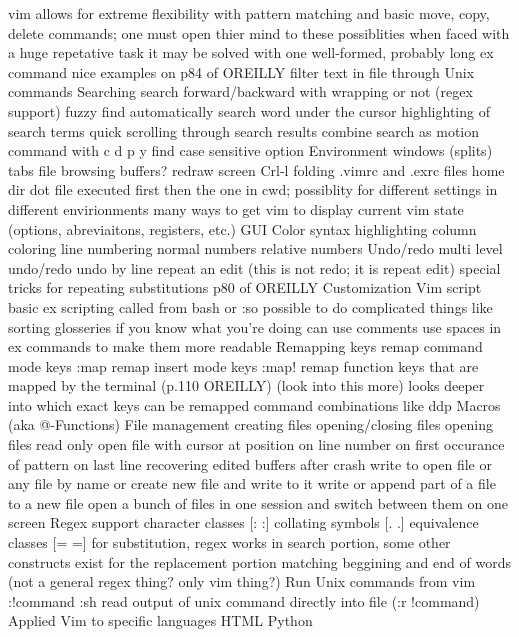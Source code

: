 \documentclass[12pt]{book}
\begin{document}
    vim allows for extreme flexibility with pattern matching and basic move, copy, delete commands; one must open thier mind to these possiblities when faced with a huge repetative task
    it may be solved with one well-formed, probably long ex command
    nice examples on p84 of OREILLY
  filter text in file through Unix commands
Searching
  search forward/backward with wrapping or not (regex support)
  fuzzy find
  automatically search word under the cursor
  highlighting of search terms
  quick scrolling through search results
  combine search as motion command with c d p y
  find
  case sensitive option
Environment
  windows (splits)
  tabs
  file browsing
  buffers?
  redraw screen Crl-l
  folding
  .vimrc and .exrc files
    home dir dot file executed first then the one in cwd; possiblity for different settings in different envirionments
  many ways to get vim to display current vim state (options, abreviaitons, registers, etc.)
GUI
  Color
    syntax highlighting
    column coloring
  line numbering
    normal numbers
    relative numbers
Undo/redo
  multi level undo/redo
  undo by line
  repeat an edit (this is not redo; it is repeat edit)
  special tricks for repeating substitutions p80 of OREILLY
Customization
  Vim script
    basic ex scripting called from bash or :so
      possible to do complicated things like sorting glosseries if you know what you're doing
      can use comments 
      use spaces in ex commands to make them more readable
  Remapping keys
    remap command mode keys :map
    remap insert mode keys :map!
    remap function keys that are mapped by the terminal (p.110 OREILLY) (look into this more)
    looks deeper into which exact keys can be remapped
  command combinations like ddp
  Macros (aka @-Functions)
File management
  creating files
  opening/closing files
  opening files read only
  open file with cursor at position
    on line number
    on first occurance of pattern
    on last line
  recovering edited buffers after crash
  write to open file or any file by name or create new file and write to it
  write or append part of a file to a new file
  open a bunch of files in one session and switch between them on one screen
Regex support
  character classes [: :]
  collating symbols [. .]
  equivalence classes [= =]
  for substitution, regex works in search portion, some other constructs exist for the replacement portion
  matching beggining and end of words (not a general regex thing? only vim thing?) 
Run Unix commands from vim
  :!command
  :sh
  read output of unix command directly into file (:r !command)
Applied Vim to specific languages
  HTML
  Python
  
\end{document}
